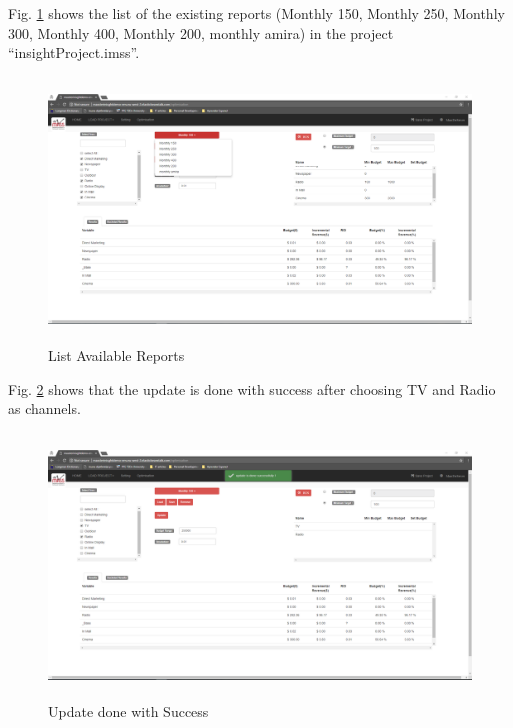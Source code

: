 Fig. \ref{LARscreentshots} shows the list of the existing reports (Monthly 150, Monthly 250, Monthly 300, Monthly 400, Monthly 200, monthly amira) in the project ``insightProject.imss''.
\begin{figure}[!h]
	\centering
	\includegraphics[width=17cm,height=7cm]{5.png}
	\caption{List Available Reports}
	\label{LARscreentshots}	
\end{figure} 
\clearpage
\newpage 
Fig. \ref{UDWSscreentshots} shows that the update is done with success after choosing  TV and Radio as channels.
\begin{figure}[!h]
	\centering
	\includegraphics[width=17cm,height=7cm]{6.png}
	\caption{Update done with Success}
	\label{UDWSscreentshots}	
\end{figure}

